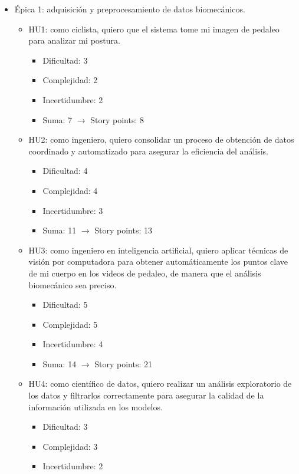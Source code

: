 \documentclass[
11pt, %
]{charter}
\begin{document}
\begin{itemize}
  \item Épica 1: adquisición y preprocesamiento de datos biomecánicos.
    \begin{itemize}
      \item HU1: como ciclista, quiero que el sistema tome mi imagen de pedaleo para analizar mi postura.
        \begin{itemize}
          \item Dificultad: 3
          \item Complejidad: 2
          \item Incertidumbre: 2
          \item Suma: 7 $\rightarrow$ Story points: 8
        \end{itemize}
      \item HU2: como ingeniero, quiero consolidar un proceso de obtención de datos coordinado y automatizado para asegurar la eficiencia del análisis.
        \begin{itemize}
          \item Dificultad: 4
          \item Complejidad: 4
          \item Incertidumbre: 3
          \item Suma: 11 $\rightarrow$ Story points: 13
        \end{itemize}
      \item HU3: como ingeniero en inteligencia artificial, quiero aplicar técnicas de visión por computadora para obtener automáticamente los puntos clave de mi cuerpo en los videos de pedaleo, de manera que el análisis biomecánico sea preciso.
        \begin{itemize}
          \item Dificultad: 5
          \item Complejidad: 5
          \item Incertidumbre: 4
          \item Suma: 14 $\rightarrow$ Story points: 21
        \end{itemize}
      \item HU4: como científico de datos, quiero realizar un análisis exploratorio de los datos y filtrarlos correctamente para asegurar la calidad de la información utilizada en los modelos.
        \begin{itemize}
          \item Dificultad: 3
          \item Complejidad: 3
          \item Incertidumbre: 2

\end{itemize}
\end{itemize}
\end{itemize}
\end{document}
